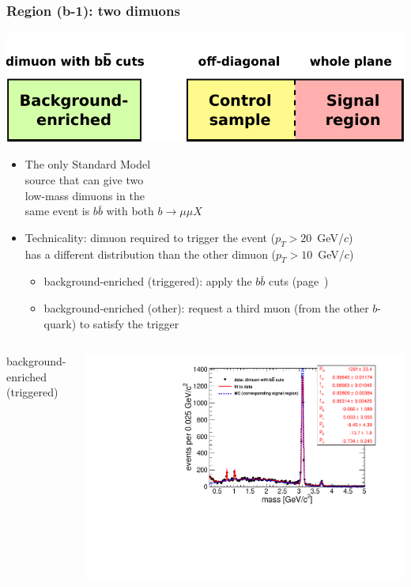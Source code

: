 \documentclass[compress]{beamer}
\begin{document}
\begin{frame}
\frametitle{Region (b-1): two dimuons}

\hfill \includegraphics[width=0.5\linewidth]{bkgnd_control_signal_b-1.pdf}

\vspace{-1.5 cm}
\begin{itemize}
\item The only Standard Model \\ source that can give two \\ low-mass dimuons in the \\ same event is $b\bar{b}$ with both $b \to \mu\mu X$
\item Technicality: dimuon required to trigger the event {\scriptsize ($p_T > 20$~GeV/$c$)} \\ has a
  different distribution than the other dimuon {\scriptsize ($p_T > 10$~GeV/$c$)}
\begin{itemize}
\item background-enriched (triggered): apply the $b\bar{b}$ cuts (page~\pageref{pag:bbcuts})
\item background-enriched (other): request a third muon (from the other $b$-quark) to satisfy the trigger
\end{itemize}
\end{itemize}

\begin{columns}
\centering background-enriched (triggered)

\includegraphics[width=\linewidth]{fullscale-backgroundEnriched_massC.pdf}


\end{columns}
\end{frame}
\end{document}
